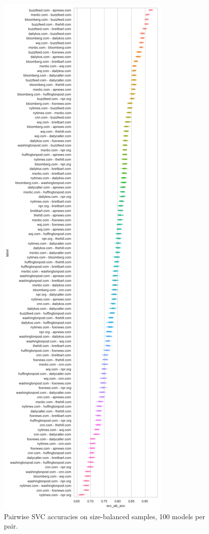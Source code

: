 \documentclass{scrartcl}
\begin{document}
\begin{figure}
  \centering
  \includegraphics[height=\textheight]{figures/svc-ab-acc.png}
  \caption{Pairwise SVC accuracies on size-balanced samples, 100 models per pair.}
  \label{svc-ab-acc}
\end{figure}
\end{document}

